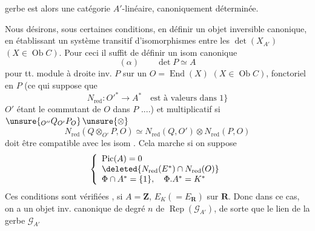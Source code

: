 
 gerbe est alors une catégorie $A'$-linéaire, canoniquement déterminée.


Nous désirons, sous certaines conditions, en définir un objet inversible canonique, en établissant un système transitif d'isomorphismes entre les $\det(X_{A'})$ $(X\in\operatorname{Ob}C)$. Pour ceci il suffit de définir un isom canonique
\[
(\alpha)\qquad \det P\simeq A
\]
pour tt. module à droite inv. $P$ sur un $O=\operatorname{End}(X)$ $(X\in\operatorname{Ob}C)$, fonctoriel en $P$ (ce qui suppose que
\[
N_{\mathrm{red}}:O'^*\longrightarrow A^*\quad\text{est à valeurs dans }1\}
\]
$O'$ étant le commutant de $O$ dans $P$ ....) et multiplicatif si $\unsure{{}_{O''}Q_{O'}P_O}\,\unsure{\otimes}$
\[
N_{\mathrm{red}}(Q\otimes_{O'}P,O)\simeq N_{\mathrm{red}}(Q,O')\otimes N_{\mathrm{red}}(P,O)
\]
doit être compatible avec les isom . Cela marche si on suppose
\margin{[posant $\Phi=N_{\mathrm{red}}(E^*)\subset K^*$, où $O=\operatorname{End}(X)$, $E=O\otimes_A K$]}
\[
\left\{\begin{array}{l}
\operatorname{Pic}(A)=0\\
\deleted{N_{\mathrm{red}}(E^*)\cap N_{\mathrm{red}}(O)}\\
\Phi\cap A^*=\{1\},\quad \Phi.A^*=K^*
\end{array}\right.
\]
Ces conditions sont vérifiées  , si $A=\mathbf Z$, $E_K(=E_{\mathbf R})$  sur $\mathbf R$. Donc dans ce cas, on a un objet inv. canonique de degré $n$ de $\operatorname{Rep}(\mathcal G_{A'})$, de sorte que le lien  de la gerbe $\mathcal G_{A'}$

